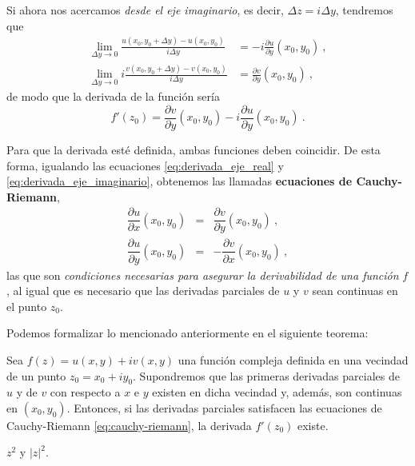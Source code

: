 Si ahora nos acercamos \emph{desde el eje imaginario}, es decir, $\Delta z = i\Delta y$, tendremos que
\begin{align*}
    \lim_{\Delta y \to 0} \frac{u(x_0, y_0 + \Delta y) - u(x_0, y_0)}{i \Delta y} & = -i \frac{\partial u}{\partial y}(x_0, y_0) \ , \\
    \lim_{\Delta y \to 0} i \frac{v(x_0, y_0 + \Delta y) - v(x_0, y_0)}{i \Delta y} & = \frac{\partial v}{\partial y}(x_0, y_0) \ ,
\end{align*}
de modo que la derivada de la función sería
\begin{equation}\label{eq:derivada_eje_imaginario}
    f'(z_0) = \frac{\partial v}{\partial y}(x_0, y_0) - i \frac{\partial u}{\partial y} (x_0, y_0) \ .
\end{equation}

Para que la derivada esté definida, ambas funciones deben coincidir. De esta forma, igualando las ecuaciones \eqref{eq:derivada_eje_real} y \eqref{eq:derivada_eje_imaginario}, obtenemos las llamadas \textbf{ecuaciones de Cauchy-Riemann},
\begin{equation} \label{eq:cauchy-riemann}
    \begin{array}{ccc}
        \dfrac{\partial u}{\partial x}(x_0, y_0) & = & \dfrac{\partial v}{\partial y}(x_0, y_0) \ , \\
        \dfrac{\partial u}{\partial y}(x_0, y_0) & = & - \dfrac{\partial v}{\partial x}(x_0, y_0) \ ,
    \end{array}
\end{equation}
las que son \emph{condiciones necesarias para asegurar la derivabilidad de una función} $f$, al igual que es necesario que las derivadas parciales de $u$ y $v$ sean continuas en el punto $z_0$.

Podemos formalizar lo mencionado anteriormente en el siguiente teorema:
\begin{teorema}
    Sea $f(z) = u(x,y) + i v(x,y)$ una función compleja definida en una vecindad de un punto $z_0 = x_0 + i y_0$. Supondremos que las primeras derivadas parciales de $u$ y de $v$ con respecto a $x$ e $y$ existen en dicha vecindad y, además, son continuas en $(x_0, y_0)$. Entonces, si las derivadas parciales satisfacen las ecuaciones de Cauchy-Riemann \eqref{eq:cauchy-riemann}, la derivada $f'(z_0)$ existe.
\end{teorema}

\begin{ejemplo}
    $z^2$ y $|z|^2$.
\end{ejemplo}

